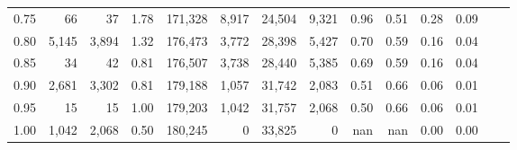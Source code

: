 \begin{tabular}{rrrrrrrrrrrrrr}
0.75 &      66 &     37 &    1.78 &  171,328 &    8,917 &  24,504 &   9,321 &  0.96 &  0.51 &  0.28 &      0.09 \\
0.80 &   5,145 &  3,894 &    1.32 &  176,473 &    3,772 &  28,398 &   5,427 &  0.70 &  0.59 &  0.16 &      0.04 \\
0.85 &      34 &     42 &    0.81 &  176,507 &    3,738 &  28,440 &   5,385 &  0.69 &  0.59 &  0.16 &      0.04 \\
0.90 &   2,681 &  3,302 &    0.81 &  179,188 &    1,057 &  31,742 &   2,083 &  0.51 &  0.66 &  0.06 &      0.01 \\
0.95 &      15 &     15 &    1.00 &  179,203 &    1,042 &  31,757 &   2,068 &  0.50 &  0.66 &  0.06 &      0.01 \\
1.00 &   1,042 &  2,068 &    0.50 &  180,245 &        0 &  33,825 &       0 &   nan &   nan &  0.00 &      0.00 \\
\bottomrule
\end{tabular}
